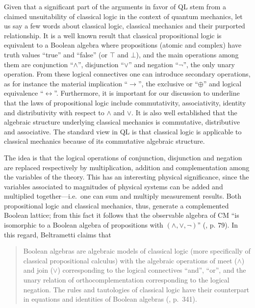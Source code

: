 \documentclass[11pt, executivepaper]{article}
\begin{document}
Given that a significant part of the arguments in favor of QL stem from a claimed unsuitability of classical logic in the context of quantum mechanics, let us say a few words about classical logic, classical mechanics and their purported relationship.  It is a well known result that classical propositional logic is equivalent to a Boolean algebra where propositions (atomic and complex) have truth values ``true'' and ``false'' (or $\top$ and $\bot$), and the main operations among them are conjunction ``$\wedge$'', disjunction ``$\vee$'' and negation ``$\neg$'', the only unary operation. From these logical connectives one can introduce secondary operations, as for instance the material implication ``$\longrightarrow$'', the exclusive or ``$\oplus$'' and logical equivalence ``$\longleftrightarrow$''. Furthermore, it is important for our discussion to underline that the laws of propositional logic include commutativity, associativity, identity and distributivity with respect to $\wedge$ and $\vee$. It is also well established that the algebraic structure underlying classical mechanics is commutative, distributive and associative. The standard view in QL is that classical logic is applicable to classical mechanics because of its commutative algebraic structure.

The idea is that the logical operations of conjunction, disjunction and negation are replaced respectively by multiplication, addition and complementation among the variables of the theory. This has an interesting physical significance, since the variables associated to magnitudes of physical systems can be added and multiplied together---i.e.\ one can sum and multiply measurement results. Both propositional logic and classical mechanics, thus, generate a complemented Boolean lattice; from this fact it follows that the observable algebra of CM ``is isomorphic to a Boolean algebra of propositions with $(\wedge, \vee, \neg)$'' (\cite{David:2015}, p. 79).
In this regard, Beltrametti claims that 
\begin{quote}
Boolean algebras are algebraic models of classical logic (more specifically of classical propositional calculus) with the algebraic operations of meet ($\wedge$) and join ($\vee$) corresponding to the logical connectives ``and'', ``or'', and the unary relation of orthocomplementation corresponding to the logical negation. The rules and tautologies of classical logic have their counterpart in equations and identities of Boolean algebras (\cite{Beltrametti:2004}, p.\ 341). 
\end{quote}
\end{document}
